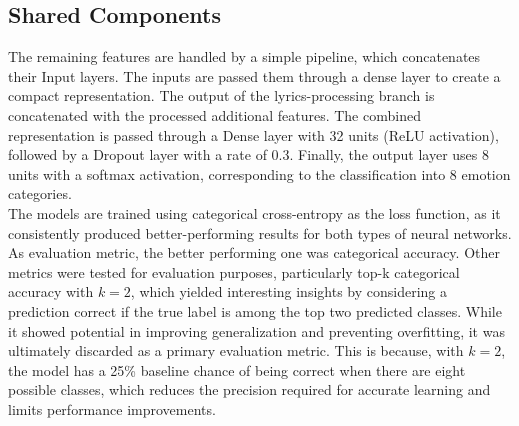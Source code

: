 \subsection*{Shared Components}
The remaining features are handled by a simple pipeline, which concatenates
their Input layers.
The inputs are passed them through a dense layer to create a compact
representation.
The output of the lyrics-processing branch is concatenated with the processed
additional features.
The combined representation is passed through a Dense layer with 32 units
(ReLU activation), followed by a Dropout layer with a rate of 0.3.
Finally, the output layer uses 8 units with a softmax activation, corresponding
to the classification into 8 emotion categories.\\


The models are trained using categorical cross-entropy as the loss function,
as it consistently produced better-performing results for both types of
neural networks.
As evaluation metric, the better performing one was categorical accuracy.
Other metrics were tested for evaluation purposes, particularly
top-k categorical accuracy with $k=2$, which yielded interesting insights
by considering a prediction correct if the true label is among the top two
predicted classes. While it showed potential in improving generalization and
preventing overfitting, it was ultimately discarded as a primary evaluation
metric. This is because, with $k=2$, the model has a 25\% baseline
chance of being correct when there are eight possible classes, which reduces
the precision required for accurate learning and limits performance improvements.